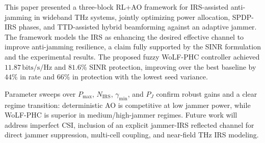 \documentclass[journal,twocolumn]{IEEEtran}
\begin{document}
This paper presented a three-block RL+AO framework for IRS-assisted anti-jamming in wideband THz systems, jointly optimizing power allocation, SPDP-IRS phases, and TTD-assisted hybrid beamforming against an adaptive jammer. The framework models the IRS as enhancing the desired effective channel to improve anti-jamming resilience, a claim fully supported by the SINR formulation and the experimental results. The proposed fuzzy WoLF-PHC controller achieved $11.87\,\text{bits/s/Hz}$ and $81.6\%$ SINR protection, improving over the best baseline by $44\%$ in rate and $66\%$ in protection with the lowest seed variance.

Parameter sweeps over $P_{\max}$, $N_\mathrm{IRS}$, $\gamma_{\min}$, and $P_J$ confirm robust gains and a clear regime transition: deterministic AO is competitive at low jammer power, while WoLF-PHC is superior in medium/high-jammer regimes. Future work will address imperfect CSI, inclusion of an explicit jammer-IRS reflected channel for direct jammer suppression, multi-cell coupling, and near-field THz IRS modeling.

\end{document}
